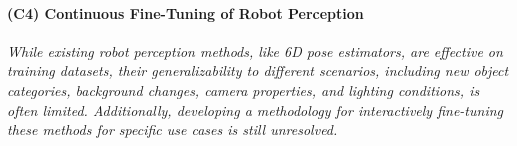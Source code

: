 \documentclass{erc-B2}
\begin{document}

\paragraph{(C4) Continuous Fine-Tuning of Robot Perception}
\textit{While existing robot perception methods, like 6D pose estimators, are effective on training datasets, their generalizability to different scenarios, including new object categories, background changes, camera properties, and lighting conditions, is often limited. Additionally, developing a methodology for interactively fine-tuning these methods for specific use cases is still unresolved.}
\end{document}
